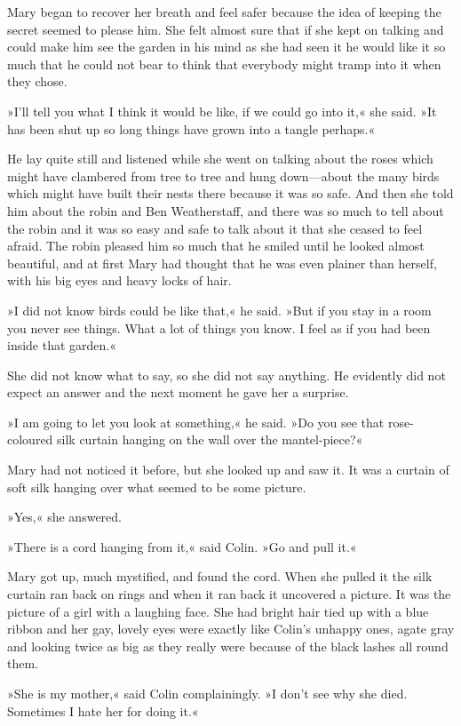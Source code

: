Mary began to recover her breath and feel safer because the idea of keeping the secret seemed to please him. She felt almost sure that if she kept on talking and could make him see the garden in his mind as she had seen it he would like it so much that he could not bear to think that everybody might tramp into it when they chose.

»I'll tell you what I think it would be like, if we could go into it,« she said. »It has been shut up so long things have grown into a tangle perhaps.«

He lay quite still and listened while she went on talking about the roses which might have clambered from tree to tree and hung down—about the many birds which might have built their nests there because it was so safe. And then she told him about the robin and Ben Weatherstaff, and there was so much to tell about the robin and it was so easy and safe to talk about it that she ceased to feel afraid. The robin pleased him so much that he smiled until he looked almost beautiful, and at first Mary had thought that he was even plainer than herself, with his big eyes and heavy locks of hair.

»I did not know birds could be like that,« he said. »But if you stay in a room you never see things. What a lot of things you know. I feel as if you had been inside that garden.«

She did not know what to say, so she did not say anything. He evidently did not expect an answer and the next moment he gave her a surprise.

»I am going to let you look at something,« he said. »Do you see that rose-coloured silk curtain hanging on the wall over the mantel-piece?«

Mary had not noticed it before, but she looked up and saw it. It was a curtain of soft silk hanging over what seemed to be some picture.

»Yes,« she answered.

»There is a cord hanging from it,« said Colin. »Go and pull it.«

Mary got up, much mystified, and found the cord. When she pulled it the silk curtain ran back on rings and when it ran back it uncovered a picture. It was the picture of a girl with a laughing face. She had bright hair tied up with a blue ribbon and her gay, lovely eyes were exactly like Colin's unhappy ones, agate gray and looking twice as big as they really were because of the black lashes all round them.

»She is my mother,« said Colin complainingly. »I don't see why she died. Sometimes I hate her for doing it.«

